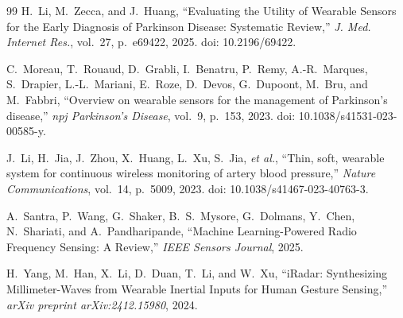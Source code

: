 \begin{thebibliography}{99}
H.~Li, M.~Zecca, and J.~Huang, ``Evaluating the Utility of Wearable Sensors for the Early Diagnosis of Parkinson Disease: Systematic Review,'' \textit{J. Med. Internet Res.}, vol.~27, p.~e69422, 2025. doi: 10.2196/69422.

C.~Moreau, T.~Rouaud, D.~Grabli, I.~Benatru, P.~Remy, A.-R.~Marques, S.~Drapier, L.-L.~Mariani, E.~Roze, D.~Devos, G.~Dupoont, M.~Bru, and M.~Fabbri, ``Overview on wearable sensors for the management of Parkinson's disease,'' \textit{npj Parkinson's Disease}, vol.~9, p.~153, 2023. doi: 10.1038/s41531-023-00585-y.

J.~Li, H.~Jia, J.~Zhou, X.~Huang, L.~Xu, S.~Jia, \textit{et al.}, ``Thin, soft, wearable system for continuous wireless monitoring of artery blood pressure,'' \textit{Nature Communications}, vol.~14, p.~5009, 2023. doi: 10.1038/s41467-023-40763-3.

A.~Santra, P.~Wang, G.~Shaker, B.~S.~Mysore, G.~Dolmans, Y.~Chen, N.~Shariati, and A.~Pandharipande, ``Machine Learning-Powered Radio Frequency Sensing: A Review,'' \textit{IEEE Sensors Journal}, 2025.

H.~Yang, M.~Han, X.~Li, D.~Duan, T.~Li, and W.~Xu, ``iRadar: Synthesizing Millimeter-Waves from Wearable Inertial Inputs for Human Gesture Sensing,'' \textit{arXiv preprint arXiv:2412.15980}, 2024.

\end{thebibliography}
